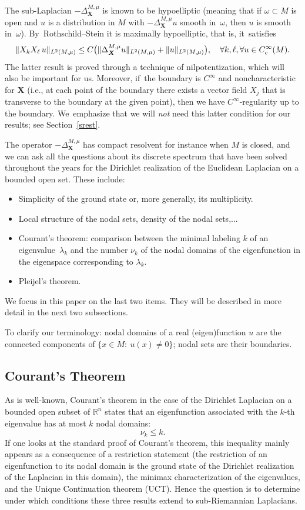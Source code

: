 \documentclass[11pt]{article}
\newcommand{\ie}{i.e.,\xspace}
\newcommand{\rc}{\textup{c}}
\newcommand{\bX}{{\boldsymbol{X}}}
\theoremstyle{definition}
\newcommand{\1}{\mathbbm{1}}
\numberwithin{equation}{section}
\begin{document}
The sub-Laplacian $-\Delta_\bX^{M,\mu}$ is known to be hypoelliptic \cite{Ho} (meaning that if $\omega\subset M$ is open and $u$ is a distribution in $M$ with $-\Delta_\bX^{M,\mu} u$ smooth in~$\omega$, then $u$ is smooth in~$\omega$). By~Rothschild--Stein \cite{RS} it is maximally hypoelliptic, that is, it~satisfies
\[
\| X_k X_\ell \,u \|_{L^2(M,\mu)} \leq C \bigl(\|\Delta_\bX^{M,\mu} u \|_{L^2(M,\mu)} + \|u\|_{L^2(M,\mu)} \bigr), \quad \forall k,\ell, \forall u \in C_\rc^\infty(M).
\]
The latter result is proved through a technique of nilpotentization, which will also be important for us. Moreover, if~the boundary is $C^\infty$ and noncharacteristic for $\bX$ (\ie at each point of the boundary there exists a vector field $ X_j$ that is transverse to the boundary at the given point), then we have $C^\infty$-regularity up to the boundary. We~emphasize that we will \emph{not} need this latter condition for our results; see Section~\ref{srest}.

The operator $-\Delta_\bX^{M,\mu}$ has compact resolvent for instance when $M$ is closed, and we can ask all the questions about its discrete spectrum that have been solved throughout the years for the Dirichlet realization of the Euclidean Laplacian on a bounded open set. These include:
\begin{itemize}
\item Simplicity of the ground state or, more generally, its multiplicity.
\item Local structure of the nodal sets, density of the nodal sets,...
\item Courant's theorem: comparison between the minimal labeling $ k$ of an eigenvalue~$\lambda_k$ and the number $\nu_k$ of the nodal domains of the eigenfunction in the eigenspace corresponding to $\lambda_k$.
\item Pleijel's theorem.
\end{itemize}
We focus in this paper on the last two items. They will be described in more detail in the next two subsections.

To clarify our terminology: nodal domains of a real (eigen)function $u$ are the connected components of $\{ x\in M:\ u(x) \neq 0\}$; nodal sets are their boundaries.

\subsection{Courant's Theorem}
As is well-known, Courant's theorem in the case of the Dirichlet Laplacian on a bounded open subset of $\mathbb R^n$ states that an eigenfunction associated with the $k$-th eigenvalue has at most $k$ nodal domains:
\[
\nu_k \leq k.
\]
If one looks at the standard proof of Courant's theorem, this inequality mainly appears as a consequence of a restriction statement (the restriction of an eigenfunction to its nodal domain is the ground state of the Dirichlet realization of the Laplacian in this domain), the minimax characterization of the eigenvalues, and the Unique Continuation theorem (UCT). Hence the question is to determine under which conditions these three results extend to sub-Riemannian Laplacians.
\end{document}
